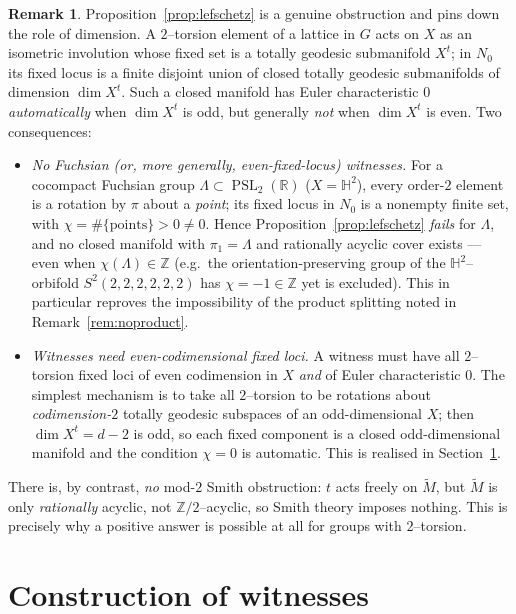 \documentclass[12pt]{article}
\newcommand{\bR}{\mathbb{R}}
\newcommand{\bZ}{\mathbb{Z}}
\newcommand{\bH}{\mathbb{H}}
\DeclareMathOperator{\PSL}{PSL}
\theoremstyle{definition}
\newtheorem{remark}{Remark}
\begin{document}
\begin{remark}\label{rem:fuchsian}
Proposition~\ref{prop:lefschetz} is a genuine obstruction and pins down the role
of dimension.  A $2$--torsion element of a lattice in $G$ acts on $X$ as an
isometric involution whose fixed set is a totally geodesic submanifold $X^{t}$;
in $N_0$ its fixed locus is a finite disjoint union of closed totally geodesic
submanifolds of dimension $\dim X^{t}$.  Such a closed manifold has Euler
characteristic $0$ \emph{automatically} when $\dim X^{t}$ is odd, but generally
\emph{not} when $\dim X^{t}$ is even.  Two consequences:
\begin{itemize}
\item \emph{No Fuchsian (or, more generally, even-fixed-locus) witnesses.}  For a
cocompact Fuchsian group $\Lambda\subset\PSL_2(\bR)$ ($X=\bH^2$), every order-$2$
element is a rotation by $\pi$ about a \emph{point}; its fixed locus in $N_0$ is a
nonempty finite set, with $\chi=\#\{\text{points}\}>0\neq0$.  Hence
Proposition~\ref{prop:lefschetz} \emph{fails} for $\Lambda$, and no closed
manifold with $\pi_1=\Lambda$ and rationally acyclic cover exists --- even when
$\chi(\Lambda)\in\bZ$ (e.g.\ the orientation-preserving group of the
$\bH^2$--orbifold $S^2(2,2,2,2,2,2)$ has $\chi=-1\in\bZ$ yet is excluded).  This
in particular reproves the impossibility of the product splitting noted in
Remark~\ref{rem:noproduct}.
\item \emph{Witnesses need even-codimensional fixed loci.}  A witness must have
all $2$--torsion fixed loci of even codimension in $X$ \emph{and} of Euler
characteristic $0$.  The simplest mechanism is to take all $2$--torsion to be
rotations about \emph{codimension-$2$} totally geodesic subspaces of an
odd-dimensional $X$; then $\dim X^{t}=d-2$ is odd, so each fixed component is a
closed odd-dimensional manifold and the condition $\chi=0$ is automatic.  This is
realised in Section~\ref{sec:construction}.
\end{itemize}
There is, by contrast, \emph{no} mod-$2$ Smith obstruction: $t$ acts freely on
$\widetilde M$, but $\widetilde M$ is only \emph{rationally} acyclic, not
$\bZ/2$--acyclic, so Smith theory imposes nothing.  This is precisely why a
positive answer is possible at all for groups with $2$--torsion.
\end{remark}

\section{Construction of witnesses}\label{sec:construction}
\end{document}
